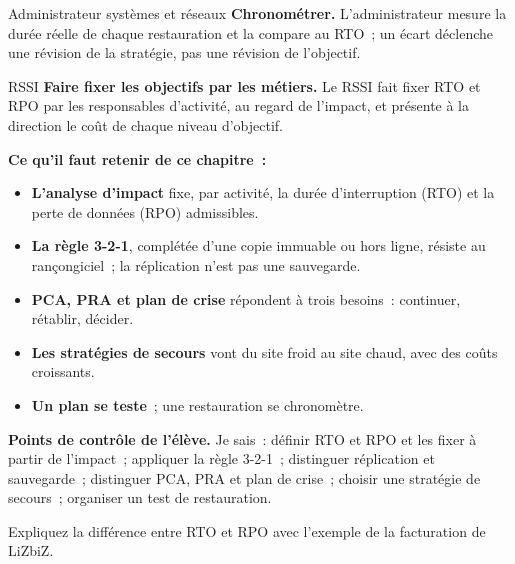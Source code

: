 \begin{boxmetier}{Administrateur systèmes et réseaux}
\textbf{Chronométrer.} L'administrateur mesure la durée réelle de chaque
restauration et la compare au RTO~; un écart déclenche une révision de la
stratégie, pas une révision de l'objectif.
\end{boxmetier}

\begin{boxmetier}{RSSI}
\textbf{Faire fixer les objectifs par les métiers.} Le RSSI fait fixer RTO
et RPO par les responsables d'activité, au regard de l'impact, et présente
à la direction le coût de chaque niveau d'objectif.
\end{boxmetier}

\separateur

\begin{boxresume}
\textbf{Ce qu'il faut retenir de ce chapitre~:}
\begin{itemize}
    \item \textbf{L'analyse d'impact} fixe, par activité, la durée
          d'interruption (RTO) et la perte de données (RPO) admissibles.
    \item \textbf{La règle 3-2-1}, complétée d'une copie immuable ou hors
          ligne, résiste au rançongiciel~; la réplication n'est pas une
          sauvegarde.
    \item \textbf{PCA, PRA et plan de crise} répondent à trois besoins~:
          continuer, rétablir, décider.
    \item \textbf{Les stratégies de secours} vont du site froid au site
          chaud, avec des coûts croissants.
    \item \textbf{Un plan se teste}~; une restauration se chronomètre.
\end{itemize}
\end{boxresume}

\begin{boxinfo}
\textbf{Points de contrôle de l'élève.} Je sais~: définir RTO et RPO et
les fixer à partir de l'impact~; appliquer la règle 3-2-1~; distinguer
réplication et sauvegarde~; distinguer PCA, PRA et plan de crise~; choisir
une stratégie de secours~; organiser un test de restauration.
\end{boxinfo}

\bigskip

\begin{boxexo}[title={\ding{45}\quad Exercice~23.1. RTO et RPO \niveaubase}]
Expliquez la différence entre RTO et RPO avec l'exemple de la facturation
de LiZbiZ.
\end{boxexo}

